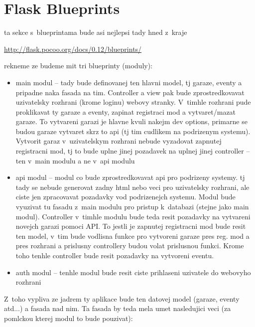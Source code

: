 \section{Flask Blueprints}

ta sekce s~blueprintama bude asi nejlepsi tady hned z~kraje

\url{http://flask.pocoo.org/docs/0.12/blueprints/}

rekneme ze budeme mit tri blueprinty (moduly):

\begin{itemize}
    \item main modul -- tady bude definovanej ten hlavni model, tj garaze, eventy a pripadne naka fasada na tim. Controller a view pak bude zprostredkovavat uzivatelsky rozhrani (krome loginu) webovy stranky. V~timhle rozhrani pude proklikavat ty garaze a eventy, zapinat registraci mod a vytvaret/mazat garaze. To vytvareni garazi je hlavne kvuli nakejm dev options, primarne se budou garaze vytvaret skrz to api (tj tim cudlikem na podrizenym systemu). Vytvorit garaz v~uzivatelskym rozhrani nebude vyzadovat zapnutej registracni mod, tj to bude uplne jinej pozadavek na uplnej jinej controller -- ten v~main modulu a ne v~api modulu
    \item api modul -- modul co bude zprostredkovavat api pro podrizeny systemy. tj tady se nebude generovat zadny html nebo veci pro uzivatelsky rozhrani, ale ciste jen zpracovavat pozadavky vod podrizenejch systemu. Modul bude vyuzivat tu fasadu z~main modulu pro pristup k~databazi (stejne jako main modul). Controller v~timhle modulu bude teda resit pozadavky na vytvareni novejch garazi pomoci API. To jestli je zapnutej registracni mod bude resit ten model, v~tim bude vodlisna funkce pro vytvoreni garaze pres reg. mod a pres rozhrani a prislusny controllery budou volat prislusnou funkci. Krome toho tenhle controller bude resit pozadavky na vytvoreni eventu.
    \item auth modul -- tenhle modul bude resit ciste prihlaseni uzivatele do webovyho rozhrani
\end{itemize}

Z~toho vypliva ze jadrem ty aplikace bude ten datovej model (garaze, eventy atd...) a fasada nad nim. Ta fasada by teda mela umet nasledujici veci (za pomlckou kterej modul to bude pouzivat):

